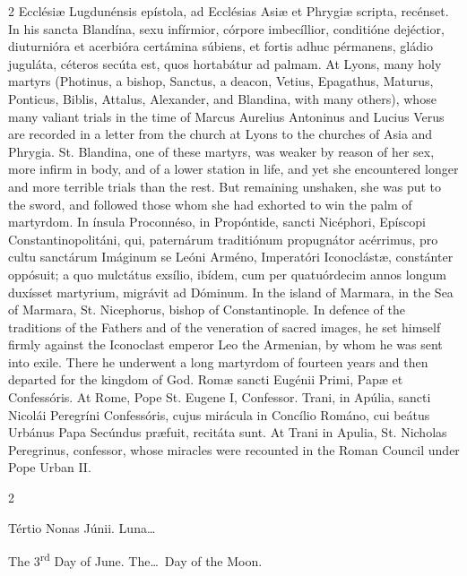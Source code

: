 \begin{paracol}{2}
 Ecclésiæ Lugdunénsis epístola, ad Ecclésias Asiæ et Phrygiæ scripta, 
 recénset. In his sancta Blandína, sexu infírmior, córpore imbecíllior, 
 conditióne dejéctior, diuturnióra et acerbióra certámina súbiens, et fortis 
 adhuc pérmanens, gládio juguláta, céteros secúta est, quos hortabátur ad 
 palmam.
\switchcolumn
{}
At Lyons, many holy martyrs (Photinus, 
 a bishop, Sanctus, a deacon, Vetius, Epagathus, Maturus, Ponticus, Biblis, 
 Attalus, Alexander, and Blandina, with many others), whose many valiant 
 trials in the time of Marcus Aurelius Antoninus and Lucius Verus are 
 recorded in a letter from the church at Lyons to the churches of Asia and 
 Phrygia. St. Blandina, one of these martyrs, was weaker by reason of 
 her sex, more infirm in body, and of a lower station in life, and yet she 
 encountered longer and more terrible trials than the rest. But 
 remaining unshaken, she was put to the sword, and followed those whom she 
 had exhorted to win the palm of martyrdom.
\switchcolumn*
{}
In ínsula Proconnéso, 
 in Propóntide, sancti Nicéphori, Epíscopi Constantinopolitáni, qui, 
 paternárum traditiónum propugnátor acérrimus, pro cultu sanctárum Imáginum 
 se Leóni Arméno, Imperatóri Iconoclástæ, constánter oppósuit; a quo 
 mulctátus exsílio, ibídem, cum per quatuórdecim annos longum duxísset 
 martyrium, migrávit ad Dóminum.
\switchcolumn
{}
In the island of Marmara, in the 
 Sea of Marmara, St. Nicephorus, bishop of Constantinople. In defence 
 of the traditions of the Fathers and of the veneration of sacred images, he 
 set himself firmly against the Iconoclast emperor Leo the Armenian, by whom 
 he was sent into exile. There he underwent a long martyrdom of 
 fourteen years and then departed for the kingdom of God.
\switchcolumn*
{}
Romæ sancti Eugénii 
 Primi, Papæ et Confessóris.
\switchcolumn
{}
At Rome, Pope St. Eugene I, 
 Confessor.
\switchcolumn*
{}
Trani, in Apúlia, 
 sancti Nicolái Peregríni Confessóris, cujus mirácula in Concílio Románo, cui 
 beátus Urbánus Papa Secúndus præfuit, recitáta sunt.
\switchcolumn
{}
At Trani in Apulia, St. Nicholas 
 Peregrinus, confessor, whose miracles were recounted in the Roman Council 
 under Pope Urban II.
\switchcolumn*
{}
\end{paracol}


\begin{paracol}{2}
\begin{center}{\color{gregoriocolor} Tértio Nonas Júnii. 
 Luna\dots\ }\end{center}
\switchcolumn
{}
\begin{center}{\color{gregoriocolor} The 3\textsuperscript{rd} Day of 
 June. The\dots\ Day of the Moon.}\end{center}
\end{paracol}

